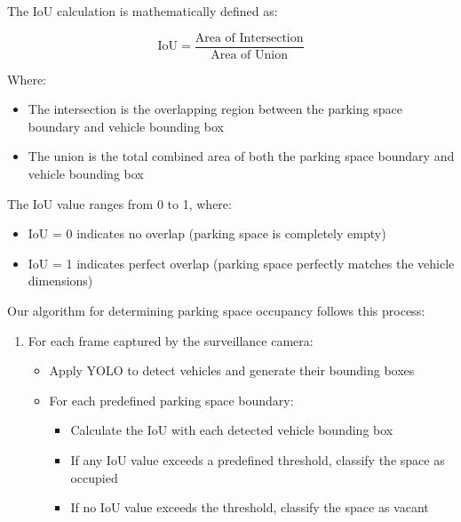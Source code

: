 The IoU calculation is mathematically defined as:

\[
\text{IoU} = \frac{\text{Area of Intersection}}{\text{Area of Union}}
\]

Where:
\begin{itemize}
    \item The intersection is the overlapping region between the parking space boundary and vehicle bounding box
    \item The union is the total combined area of both the parking space boundary and vehicle bounding box
\end{itemize}

The IoU value ranges from 0 to 1, where:
\begin{itemize}
    \item IoU = 0 indicates no overlap (parking space is completely empty)
    \item IoU = 1 indicates perfect overlap (parking space perfectly matches the vehicle dimensions)
\end{itemize}

Our algorithm for determining parking space occupancy follows this process:

\begin{enumerate}
    \item For each frame captured by the surveillance camera:
    \begin{itemize}
        \item Apply YOLO to detect vehicles and generate their bounding boxes
        \item For each predefined parking space boundary:
        \begin{itemize}
            \item Calculate the IoU with each detected vehicle bounding box
            \item If any IoU value exceeds a predefined threshold, classify the space as occupied
            \item If no IoU value exceeds the threshold, classify the space as vacant
        \end{itemize}
    \end{itemize}
    
\end{enumerate}


